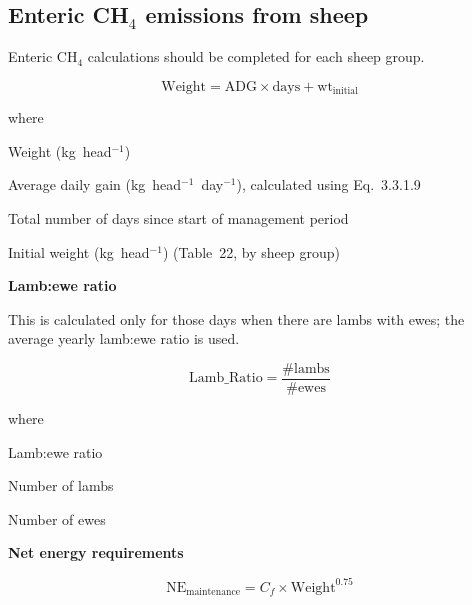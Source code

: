 \subsection{Enteric CH\texorpdfstring{$_4$}{4} emissions from sheep}
\label{subsec:sheep-enteric}

Enteric CH$_4$ calculations should be completed for each sheep group.

\begin{equation}
    \mathrm{Weight} = \mathrm{ADG} \times \mathrm{days} + \mathrm{wt}_{\mathrm{initial}}
    \tag{Eq.\ 3.3.1.1}
\end{equation}

\noindent where
\begin{description}[font=\normalfont, leftmargin=9em, style=sameline, nosep]
    \item[$\mathrm{Weight}$] Weight (kg~head$^{-1}$)
    \item[$\mathrm{ADG}$] Average daily gain (kg~head$^{-1}$~day$^{-1}$), calculated
          using Eq.~3.3.1.9
    \item[$\mathrm{days}$] Total number of days since start of management period
    \item[$\mathrm{wt}_{\mathrm{initial}}$] Initial weight (kg~head$^{-1}$) (Table~22,
          by sheep group)
\end{description}

\bigskip
\noindent\textbf{Lamb:ewe ratio}

This is calculated only for those days when there are lambs with ewes; the average
yearly lamb:ewe ratio is used.

\begin{equation}
    \mathrm{Lamb\_Ratio} = \frac{\#\mathrm{lambs}}{\#\mathrm{ewes}}
    \tag{Eq.\ 3.3.1.2}
\end{equation}

\noindent where
\begin{description}[font=\normalfont, leftmargin=9em, style=sameline, nosep]
    \item[$\mathrm{Lamb\_Ratio}$] Lamb:ewe ratio
    \item[$\#\mathrm{lambs}$] Number of lambs
    \item[$\#\mathrm{ewes}$] Number of ewes
\end{description}

\bigskip
\noindent\textbf{Net energy requirements}

\begin{equation}
    \mathrm{NE}_{\mathrm{maintenance}} = C_f \times \mathrm{Weight}^{0.75}
    \tag{Eq.\ 3.3.1.3}
\end{equation}

